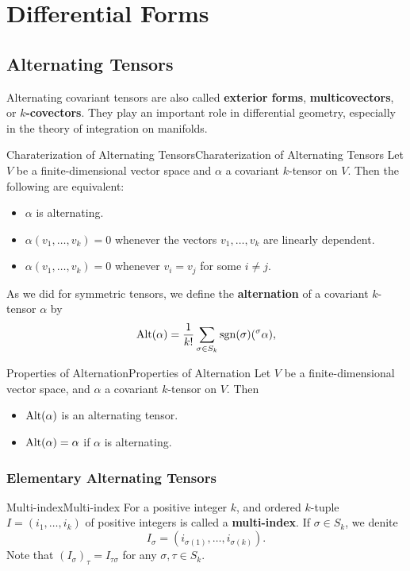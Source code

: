 \documentclass[../main.tex]{subfiles}
\begin{document}
\chapter{Differential Forms}

\section{Alternating Tensors}

Alternating covariant tensors are also called \textbf{exterior forms}, \textbf{multicovectors}, or \textbf{$k$-covectors}. They play an important role in differential geometry, especially in the theory of integration on manifolds.

\begin{lemma}{Charaterization of Alternating Tensors}{Charaterization of Alternating Tensors}
  Let $V$ be a finite-dimensional vector space and $\alpha$ a covariant $k$-tensor on $V$. Then the following are equivalent:
  \begin{itemize}
    \item $\alpha$ is alternating.
    \item $\alpha(v_1, \dots, v_k) = 0$ whenever the vectors $v_1, \dots, v_k$ are linearly dependent.
    \item $\alpha(v_1, \dots, v_k) = 0$ whenever $v_i = v_j$ for some $i \neq j$.
  \end{itemize}
\end{lemma}

As we did for symmetric tensors, we define the \textbf{alternation} of a covariant $k$-tensor $\alpha$ by
\begin{equation}
  \operatorname{Alt}(\alpha) = \frac{1}{k!} \sum_{\sigma \in S_k} \operatorname{sgn}(\sigma) (^\sigma \alpha),
\end{equation}

\begin{proposition}{Properties of Alternation}{Properties of Alternation}
  Let $V$ be a finite-dimensional vector space, and $\alpha$ a covariant $k$-tensor on $V$. Then
  \begin{itemize}
    \item $\operatorname{Alt}(\alpha)$ is an alternating tensor.
    \item $\operatorname{Alt}(\alpha) = \alpha$ if $\alpha$ is alternating.
  \end{itemize}
\end{proposition}

\subsection{Elementary Alternating Tensors}
\begin{notation}{Multi-index}{Multi-index}
  For a positive integer $k$, and ordered $k$-tuple $I = (i_1, \dots, i_k)$ of positive integers is called a \textbf{multi-index}. If $\sigma\in S_k$, we denite
  \begin{equation*}
    I_\sigma = (i_{\sigma(1)}, \dots, i_{\sigma(k)}).
  \end{equation*}
  Note that $(I_\sigma)_\tau = I_{\tau \sigma}$ for any $\sigma, \tau \in S_k$.
\end{notation}
\end{document}
